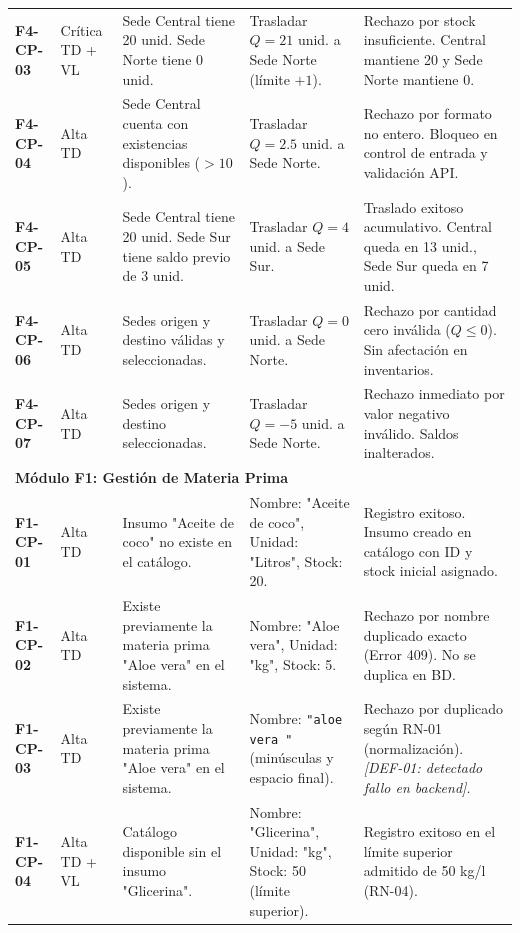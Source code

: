 \documentclass[11pt,a4paper]{article}
\begin{document}
\begin{longtable}{p{1.4cm} p{1.6cm} p{4.2cm} p{3.2cm} p{4.6cm}}
\textbf{F4-CP-03} & Crítica \newline TD + VL & Sede Central tiene 20 unid. Sede Norte tiene 0 unid. & Trasladar $Q=21$ unid. a Sede Norte (límite $+ 1$). & Rechazo por stock insuficiente. Central mantiene 20 y Sede Norte mantiene 0. \\
\textbf{F4-CP-04} & Alta \newline TD & Sede Central cuenta con existencias disponibles ($>10$). & Trasladar $Q=2.5$ unid. a Sede Norte. & Rechazo por formato no entero. Bloqueo en control de entrada y validación API. \\
\textbf{F4-CP-05} & Alta \newline TD & Sede Central tiene 20 unid. Sede Sur tiene saldo previo de 3 unid. & Trasladar $Q=4$ unid. a Sede Sur. & Traslado exitoso acumulativo. Central queda en 13 unid., Sede Sur queda en 7 unid. \\
\textbf{F4-CP-06} & Alta \newline TD & Sedes origen y destino válidas y seleccionadas. & Trasladar $Q=0$ unid. a Sede Norte. & Rechazo por cantidad cero inválida ($Q \le 0$). Sin afectación en inventarios. \\
\textbf{F4-CP-07} & Alta \newline TD & Sedes origen y destino seleccionadas. & Trasladar $Q=-5$ unid. a Sede Norte. & Rechazo inmediato por valor negativo inválido. Saldos inalterados. \\
\midrule
\multicolumn{5}{l}{\textbf{\color{primary}Módulo F1: Gestión de Materia Prima}} \\
\midrule
\textbf{F1-CP-01} & Alta \newline TD & Insumo "Aceite de coco" no existe en el catálogo. & Nombre: "Aceite de coco", Unidad: "Litros", Stock: 20. & Registro exitoso. Insumo creado en catálogo con ID y stock inicial asignado. \\
\textbf{F1-CP-02} & Alta \newline TD & Existe previamente la materia prima "Aloe vera" en el sistema. & Nombre: "Aloe vera", Unidad: "kg", Stock: 5. & Rechazo por nombre duplicado exacto (Error 409). No se duplica en BD. \\
\textbf{F1-CP-03} & Alta \newline TD & Existe previamente la materia prima "Aloe vera" en el sistema. & Nombre: \texttt{"aloe vera "} (minúsculas y espacio final). & Rechazo por duplicado según RN-01 (normalización). \textit{[DEF-01: detectado fallo en backend].} \\
\textbf{F1-CP-04} & Alta \newline TD + VL & Catálogo disponible sin el insumo "Glicerina". & Nombre: "Glicerina", Unidad: "kg", Stock: 50 (límite superior). & Registro exitoso en el límite superior admitido de 50 kg/l (RN-04). \\

\end{longtable}
\end{document}
